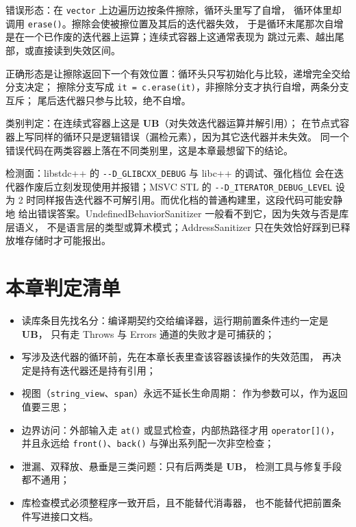 \documentclass[12pt,a4paper,fontset=fandol]{ctexbook}
\newcommand{\Fn}[1]{\texttt{#1()}}
\newcommand{\Tp}[1]{\texttt{#1}}
\newcommand{\Opt}[1]{\texttt{-\/-#1}}
\newcommand{\Bk}{\discretionary{}{}{}}
\newcommand{\UB}{\textbf{\textsf{UB}}}
\begin{document}
\begin{casebox}[title={erase 循环里的失效迭代器，以及它何时才暴露}]
错误形态：在 \Tp{vector} 上边遍历边按条件擦除，循环头里写了自增，
循环体里却调用 \Fn{erase}。擦除会使被擦位置及其后的迭代器失效，
于是循环末尾那次自增是在一个已作废的迭代器上运算；连续式容器上这通常表现为
跳过元素、越出尾部，或直接读到失效区间。

正确形态是让擦除返回下一个有效位置：循环头只写初始化与比较，递增完全交给分支决定；
擦除分支写成 \Tp{it = c.erase(it)}，非擦除分支才执行自增，两条分支互斥；
尾后迭代器只参与比较，绝不自增。

类别判定：在连续式容器上这是 \UB{}（对失效迭代器运算并解引用）；
在节点式容器上写同样的循环只是逻辑错误（漏检元素），因为其它迭代器并未失效。
同一个错误代码在两类容器上落在不同类别里，这是本章最想留下的结论。

检测面：libstdc++ 的 \Opt{D{\Bk}\_GLIBCXX{\Bk}\_DEBUG} 与 libc++ 的调试、强化档位
会在迭代器作废后立刻发现使用并报错；MSVC STL 的 \Opt{D{\Bk}\_ITERATOR{\Bk}\_DEBUG{\Bk}\_LEVEL}
设为 2 时同样报告迭代器不可解引用。而优化档的普通构建里，这段代码可能安静地
给出错误答案。UndefinedBehaviorSanitizer 一般看不到它，因为失效与否是库层语义，
不是语言层的类型或算术模式；AddressSanitizer 只在失效恰好踩到已释放堆存储时才可能报出。
\end{casebox}

\section{本章判定清单}\label{sec:ub12-checklist}

\begin{itemize}
  \item 读库条目先找名分：编译期契约交给编译器，运行期前置条件违约一定是 \UB{}，
        只有走 Throws 与 Errors 通道的失败才是可捕获的；
  \item 写涉及迭代器的循环前，先在本章长表里查该容器该操作的失效范围，
        再决定是持有迭代器还是持有引用；
  \item 视图（\Tp{string{\Bk}\_view}、\Tp{span}）永远不延长生命周期：
        作为参数可以，作为返回值要三思；
  \item 边界访问：外部输入走 \Fn{at} 或显式检查，内部热路径才用 \Fn{operator[]}，
        并且永远给 \Fn{front}、\Fn{back} 与弹出系列配一次非空检查；
  \item 泄漏、双释放、悬垂是三类问题：只有后两类是 \UB{}，
        检测工具与修复手段都不通用；
  \item 库检查模式必须整程序一致开启，且不能替代消毒器，
        也不能替代把前置条件写进接口文档。
\end{itemize}
\end{document}
